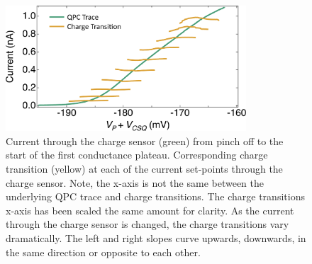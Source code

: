 \begin{figure}[ht]
  \begin{center}
    \includegraphics[width=0.8\textwidth]{figures/ch3/crop_FiguresMaster.016.png}
    \caption[Charge transitions measured at various current set points through the charge sensor]{\label{fig:ch3/cond_occ_ct_set-points} 
    Current through the charge sensor (green) from pinch off to the start of the first conductance plateau. Corresponding charge transition (yellow) at each of the current set-points through the charge sensor. Note, the x-axis is not the same between the underlying QPC trace and charge transitions. The charge transitions x-axis has been scaled the same amount for clarity. As the current through the charge sensor is changed, the charge transitions vary dramatically. The left and right slopes curve upwards, downwards, in the same direction or opposite to each other.}
  \end{center}
\end{figure}


